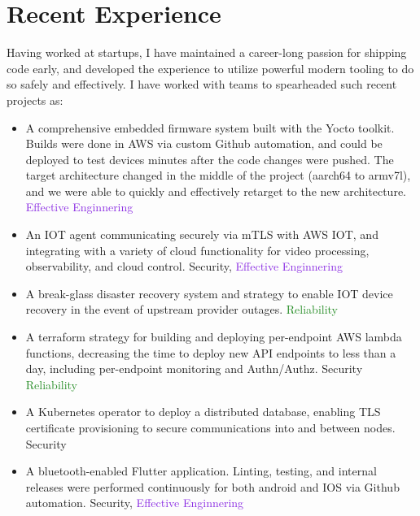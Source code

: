 \documentclass[letterpaper,11pt]{article}
\begin{document}
\section{Recent Experience}
Having worked at startups, I have maintained a
career-long passion for shipping code early, and developed the experience to
utilize powerful modern tooling to do so safely and effectively. I have
worked with teams to spearheaded such recent projects as:
\begin{itemize}
	\item A comprehensive embedded firmware system built with the Yocto toolkit. Builds were done in AWS via custom Github automation, and could be deployed to test devices minutes after the code changes were pushed. The target architecture
	      changed in the middle of the project (aarch64 to armv7l), and we were able to quickly and effectively retarget to the new architecture. \textcolor{BlueViolet}{Effective Enginnering}
	\item An IOT agent communicating securely via mTLS with AWS IOT, and integrating with a variety of cloud functionality for video processing, observability, and cloud control. \textcolor{BrickRed}{Security}, \textcolor{BlueViolet}{Effective Enginnering}
	\item A break-glass disaster recovery system and strategy to enable IOT device recovery in the event of upstream provider outages. \textcolor{ForestGreen}{Reliability}
	\item A terraform strategy for building and deploying per-endpoint AWS lambda functions, decreasing the time to deploy new API endpoints to less than a day, including per-endpoint monitoring and Authn/Authz. \textcolor{BrickRed}{Security} \textcolor{ForestGreen}{Reliability}
	\item A Kubernetes operator to deploy a distributed database, enabling TLS certificate provisioning to secure communications into and between nodes. \textcolor{BrickRed}{Security}
	\item A bluetooth-enabled Flutter application. Linting, testing, and internal releases were performed continuously for both android and IOS via Github automation. \textcolor{BrickRed}{Security}, \textcolor{BlueViolet}{Effective Enginnering}
\end{itemize}
\end{document}

